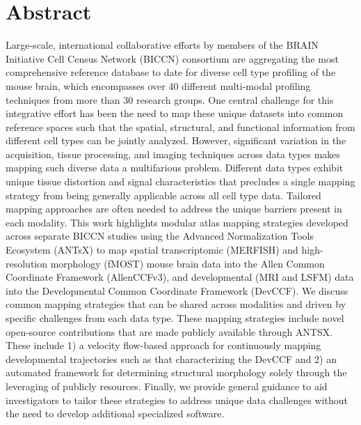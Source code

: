 \documentclass[
  12pt,
]{article}
\begin{document}
\normalsize

\newpage


\section*{Abstract}\label{abstract}

Large-scale, international collaborative efforts by members of the BRAIN
Initiative Cell Census Network (BICCN) consortium are aggregating the
most comprehensive reference database to date for diverse cell type
profiling of the mouse brain, which encompasses over 40 different
multi-modal profiling techniques from more than 30 research groups. One
central challenge for this integrative effort has been the need to map
these unique datasets into common reference spaces such that the
spatial, structural, and functional information from different cell
types can be jointly analyzed. However, significant variation in the
acquisition, tissue processing, and imaging techniques across data types
makes mapping such diverse data a multifarious problem. Different data
types exhibit unique tissue distortion and signal characteristics that
precludes a single mapping strategy from being generally applicable
across all cell type data. Tailored mapping approaches are often needed
to address the unique barriers present in each modality. This work
highlights modular atlas mapping strategies developed across separate
BICCN studies using the Advanced Normalization Tools Ecosystem (ANTsX)
to map spatial transcriptomic (MERFISH) and high-resolution morphology
(fMOST) mouse brain data into the Allen Common Coordinate Framework
(AllenCCFv3), and developmental (MRI and LSFM) data into the
Developmental Common Coordinate Framework (DevCCF). We discuss common
mapping strategies that can be shared across modalities and driven by
specific challenges from each data type. These mapping strategies
include novel open-source contributions that are made publicly available
through ANTSX. These include 1) a velocity flow-based approach for
continuously mapping developmental trajectories such as that
characterizing the DevCCF and 2) an automated framework for determining
structural morphology solely through the leveraging of publicly
resources. Finally, we provide general guidance to aid investigators to
tailor these strategies to address unique data challenges without the
need to develop additional specialized software.

\clearpage
\end{document}
